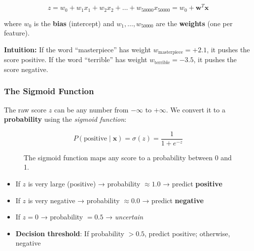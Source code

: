 \documentclass[12pt, a4paper]{article}
\begin{document}
\[
z = w_0 + w_1 x_1 + w_2 x_2 + \ldots + w_{50000} x_{50000} = w_0 + \mathbf{w}^T \mathbf{x}
\]

where $w_0$ is the \textbf{bias} (intercept) and $w_1, \ldots, w_{50000}$ are the \textbf{weights} (one per feature).

\textbf{Intuition:} If the word ``masterpiece'' has weight $w_{\text{masterpiece}} = +2.1$, it pushes the score positive. If the word ``terrible'' has weight $w_{\text{terrible}} = -3.5$, it pushes the score negative.

\subsubsection{The Sigmoid Function}

The raw score $z$ can be any number from $-\infty$ to $+\infty$. We convert it to a \textbf{probability} using the \emph{sigmoid function}:

\[
P(\text{positive} \mid \mathbf{x}) = \sigma(z) = \frac{1}{1 + e^{-z}}
\]

\begin{figure}[H]
\centering
{}
\caption{The sigmoid function maps any score to a probability between 0 and 1.}
\end{figure}

\begin{itemize}
  \item If $z$ is very large (positive) → probability $\approx 1.0$ → predict \textcolor{positive}{\textbf{positive}}
  \item If $z$ is very negative → probability $\approx 0.0$ → predict \textcolor{negative}{\textbf{negative}}
  \item If $z = 0$ → probability $= 0.5$ → \emph{uncertain}
  \item \textbf{Decision threshold}: If probability $> 0.5$, predict positive; otherwise, negative
\end{itemize}
\end{document}

